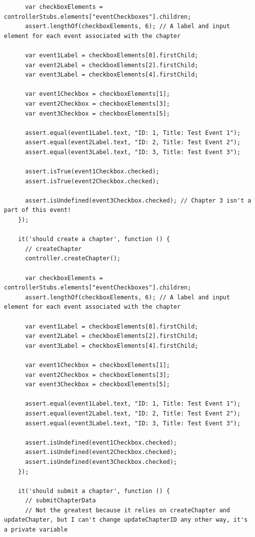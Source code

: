 \documentclass[12pt]{ucthesis}
\begin{document}
\begin{lstlisting}
      var checkboxElements = controllerStubs.elements["eventCheckboxes"].children;
      assert.lengthOf(checkboxElements, 6); // A label and input element for each event associated with the chapter

      var event1Label = checkboxElements[0].firstChild;
      var event2Label = checkboxElements[2].firstChild;
      var event3Label = checkboxElements[4].firstChild;

      var event1Checkbox = checkboxElements[1];
      var event2Checkbox = checkboxElements[3];
      var event3Checkbox = checkboxElements[5];

      assert.equal(event1Label.text, "ID: 1, Title: Test Event 1");
      assert.equal(event2Label.text, "ID: 2, Title: Test Event 2");
      assert.equal(event3Label.text, "ID: 3, Title: Test Event 3");
      
      assert.isTrue(event1Checkbox.checked);
      assert.isTrue(event2Checkbox.checked);

      assert.isUndefined(event3Checkbox.checked); // Chapter 3 isn't a part of this event!
    });

    it('should create a chapter', function () {
      // createChapter
      controller.createChapter();

      var checkboxElements = controllerStubs.elements["eventCheckboxes"].children;
      assert.lengthOf(checkboxElements, 6); // A label and input element for each event associated with the chapter

      var event1Label = checkboxElements[0].firstChild;
      var event2Label = checkboxElements[2].firstChild;
      var event3Label = checkboxElements[4].firstChild;

      var event1Checkbox = checkboxElements[1];
      var event2Checkbox = checkboxElements[3];
      var event3Checkbox = checkboxElements[5];

      assert.equal(event1Label.text, "ID: 1, Title: Test Event 1");
      assert.equal(event2Label.text, "ID: 2, Title: Test Event 2");
      assert.equal(event3Label.text, "ID: 3, Title: Test Event 3");
      
      assert.isUndefined(event1Checkbox.checked);
      assert.isUndefined(event2Checkbox.checked);
      assert.isUndefined(event3Checkbox.checked);
    });

    it('should submit a chapter', function () {
      // submitChapterData
      // Not the greatest because it relies on createChapter and updateChapter, but I can't change updateChapterID any other way, it's a private variable


\end{lstlisting}
\end{document}
